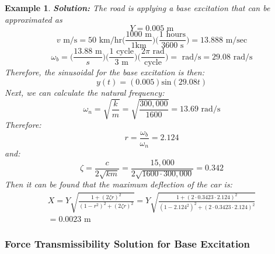 \documentclass[12pt,letter]{article}
\newtheorem{ex}{Example}
\numberwithin{ex}{section} %
\newenvironment{example}{\begin{mdframed}[middlelinewidth=0.5mm]\begin{ex}\normalfont}{\end{ex}\end{mdframed}}
\numberwithin{re}{section} %
\numberwithin{vcs}{section} %
\begin{document}
\begin{example}
					\noindent\textbf{Solution:} The road is applying a base excitation that can be approximated as 
					\begin{equation}
						Y = 0.005 \text{ m}
					\end{equation} 				
					\begin{equation}
						v \text{ m/s} = 50 \text{ km/hr}\Bigg(\frac{1000 \text{ m}}{1 \text {km}}\Bigg) \Bigg(\frac{1 \text{ hours}}{3600 \text { s}}\Bigg) = 13.888 \text{ m/sec}
					\end{equation} 	
					\begin{equation}
						\omega_b = \Bigg(\frac{ 13.88 \text{ m}}{s}\Bigg) \Bigg(\frac{ 1 \text{ cycle}}{3 \text{ m}}\Bigg) \Bigg(\frac{ 2 \pi \text{ rad}}{\text {cycle}}\Bigg) = \text{ rad/s} = 29.08 \text{ rad/s} 
					\end{equation} 	
					Therefore, the sinusoidal for the base excitation is then:
					\begin{equation}
						y(t) = (0.005) \text{sin}(29.08 t)
					\end{equation} 	
					Next, we can calculate the natural frequency:
					\begin{equation}
						\omega_n = \sqrt{\frac{k}{m}} = \sqrt{\frac{300,000}{1600}} = 13.69 \text{ rad/s}
					\end{equation} 			
					Therefore:
					\begin{equation}
					r=\frac{\omega_b}{\omega_n}  = 2.124
					\end{equation} 		
					and:
					\begin{equation}
					\zeta = \frac{c}{2\sqrt{km}}= \frac{15,000}{2\sqrt{1600\cdot300,000}} = 0.342
					\end{equation}	
					Then it can be found that the maximum deflection of the car is:
					\begin{equation}
					\begin{split}
					X = Y \sqrt{\frac{1+(2 \zeta r)^2}{(1-r^2)^2 + (2 \zeta r )^2}} = Y \sqrt{\frac{1+(2 \cdot 0.3423 \cdot2.124)^2}{(1-2.124^2)^2 + (2 \cdot 0.3423 \cdot 2.124 )^2}}  \\ = 0.0023 \text{ m}
					\end{split}
					\end{equation} 		
				\end{example}	
					
			\subsubsection{Force Transmissibility Solution for Base Excitation}
			
\end{document}
